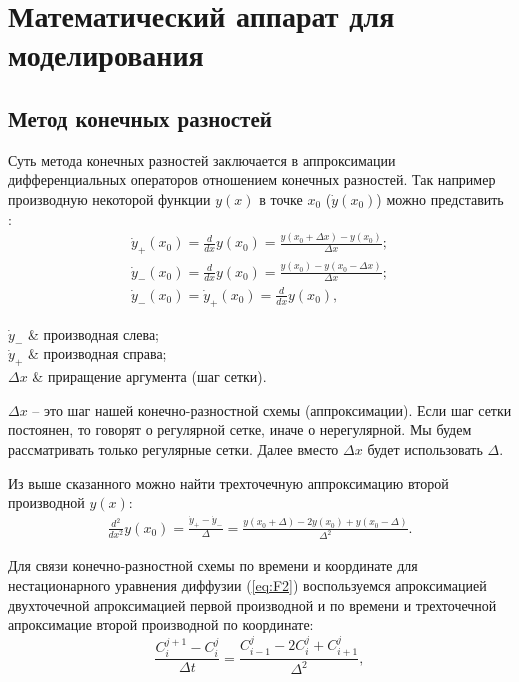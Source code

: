 \chapter{Математический аппарат для моделирования}

\section{Метод конечных разностей}
Суть метода конечных разностей заключается в аппроксимации дифференциальных операторов отношением конечных разностей. Так например производную некоторой функции $y(x)$ в точке $x_{0}$ ($\dot{y}(x_{0})$) можно представить \cite{Samarski}:
\begin{gather}
	\dot{y}_{+}(x_{0}) = \frac{d}{dx}y(x_{0}) = \frac{y(x_{0} + \Delta x) - y(x_{0})}{\Delta x };\\
	\dot{y}_{-}(x_{0}) = \frac{d}{dx}y(x_{0}) = \frac{ y(x_{0}) - y(x_{0} - \Delta x)}{\Delta x };\\
	\dot{y}_{-}(x_{0}) = \dot{y}_{+}(x_{0}) = \frac{d}{dx}y(x_{0}),
\end{gather}
\begin{conditions}
	$\dot{y}_{-}$ & производная слева;\\
	$\dot{y}_{+}$ & производная справа;\\
	$\Delta x$ & приращение аргумента (шаг сетки).
\end{conditions}

$\Delta x$ -- это шаг нашей конечно-разностной схемы (аппроксимации). Если шаг сетки постоянен, то говорят о регулярной сетке, иначе о нерегулярной. Мы будем рассматривать только регулярные сетки. Далее вместо $\Delta x$ будет использовать $\Delta$.

Из выше сказанного можно найти трехточечную аппроксимацию второй производной $y(x)$:
\begin{gather}
	\frac{d^{2}}{dx^{2}}y(x_{0}) = \frac{\dot{y}_{+} - \dot{y}_{-}}{\Delta} = \frac{y(x_{0} + \Delta) - 2y(x_{0}) + y(x_{0} - \Delta)}{ \Delta^{2}}.
\end{gather}

Для связи конечно-разностной схемы по времени и координате для нестационарного уравнения диффузии (\ref{eq:F2}) воспользуемся апроксимацией двухточечной апроксимацией первой производной и по времени и трехточечной апроксимацие второй производной по координате: 
\begin{equation}
	\label{eq:xt}
	\frac{C^{j+1}_{i} - C^{j}_{i}}{\Delta t} = \frac{C^{j}_{i-1} - 2C^{j}_{i} + C^{j}_{i+1}}{ \Delta^{2}},
\end{equation}

